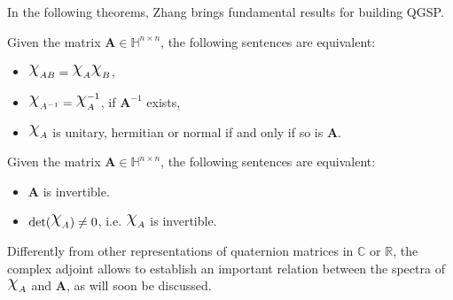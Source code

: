 In the following theorems, Zhang brings fundamental results for building QGSP.

\begin{theorem}
\label{th:equiv01}
Given the matrix $ \mathbf{A} \in \mathbb{H}^{n \times n} $, the following sentences are equivalent:

\begin{itemize}[noitemsep]
\item $ \rchi_{AB} = \rchi_{A} \rchi_{B} $,
\item $ \rchi_{A^{-1}} = \rchi_{A}^{-1}$, if $ \mathbf{A}^{-1} $ exists,
\item $ \rchi_{A}$ is unitary, hermitian or normal if and only if so is $ \mathbf{A} $.
\end{itemize}

\end{theorem}

\begin{theorem}
\label{th:equiv02}
Given the matrix $ \mathbf{A} \in \mathbb{H}^{n \times n} $, the following sentences are equivalent:

\begin{itemize}[noitemsep]
\item $\mathbf{A}$ is invertible.
\item $\mathrm{det}(\rchi_A) \neq 0$, i.e. $\rchi_{A}$ is invertible.
\end{itemize}

\end{theorem}


Differently from other representations of quaternion matrices in $ \mathbb{C} $ or $ \mathbb{R} $, the complex adjoint allows to establish an important relation between the spectra of $ \rchi_{A} $ and $ \mathbf{A} $, as will soon be discussed.

